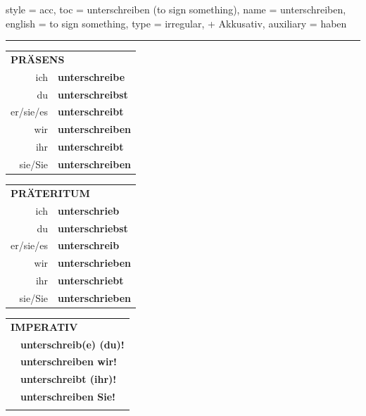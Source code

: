 \begin{verbentry}{
  style = {acc},
  toc = {unterschreiben (to sign something)},
  name = {unterschreiben},
  english = {to sign something},
  type = {irregular, + Akkusativ},
  auxiliary = {haben}
}
 
    
     \vspace{5pt}

    \hrule
    
    \vspace{5pt}

  \begin{tabular}{rl}
     \multicolumn{2}{l}{\textbf{PRÄSENS} }\\
    ich & \textbf{unterschreibe}\\
    du & \textbf{unterschreibst}\\
    er/sie/es & \textbf{unterschreibt}\\
    wir & \textbf{unterschreiben}\\
    ihr & \textbf{unterschreibt}\\
    sie/Sie & \textbf{unterschreiben}\\
  \end{tabular}
  \hfill
     \begin{tabular}{rl}
    \multicolumn{2}{l}{\textbf{PRÄTERITUM} }\\
    ich & \textbf{unterschrieb}\\
    du & \textbf{unterschriebst}\\
    er/sie/es & \textbf{unterschreib}\\
    wir & \textbf{unterschrieben}\\
    ihr & \textbf{unterschriebt}\\
    sie/Sie & \textbf{unterschrieben}\\
  \end{tabular}
  \hfill
  \begin{tabular}{rl}
     \multicolumn{2}{l}{\textbf{IMPERATIV} }\\
   & \textbf{unterschreib(e) (du)!}\\
   & \textbf{unterschreiben wir!}\\
   & \textbf{unterschreibt (ihr)!}\\
   & \textbf{unterschreiben Sie!}\\
   & \vspace{10pt}
  \end{tabular}

    \vspace{10pt}


\end{verbentry}
